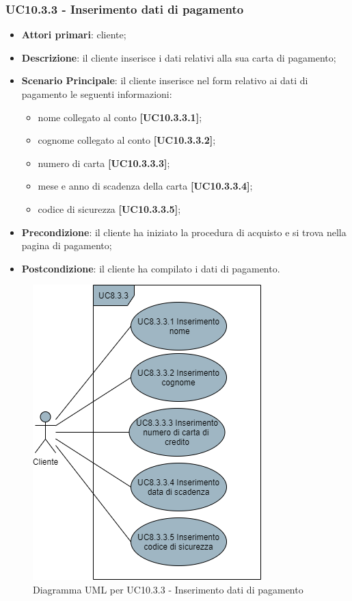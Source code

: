 \subsubsection{UC10.3.3 - Inserimento dati di pagamento}
\begin{itemize}
\item \textbf{Attori primari}: cliente;
\item \textbf{Descrizione}: il cliente inserisce i dati relativi alla sua carta di pagamento;
\item \textbf{Scenario Principale}: il cliente inserisce nel form relativo ai dati di pagamento le seguenti informazioni:
\begin{itemize}
	\item nome collegato al conto \textbf{[UC10.3.3.1]};
	\item cognome collegato al conto \textbf{[UC10.3.3.2]};
	\item numero di carta \textbf{[UC10.3.3.3]};
	\item mese e anno di scadenza della carta \textbf{[UC10.3.3.4]};
	\item codice di sicurezza \textbf{[UC10.3.3.5]};
\end{itemize}
\item \textbf{Precondizione}: il cliente ha iniziato la procedura di acquisto e si trova nella pagina di pagamento;
\item \textbf{Postcondizione}: il cliente ha compilato i dati di pagamento.
\end{itemize}

\begin{figure}[H]
\centering
\includegraphics[scale=0.6]{res/UseCase/Immagini/InserimentoDatiPagamento}
\caption{Diagramma UML per UC10.3.3 - Inserimento dati di pagamento}
\end{figure}

